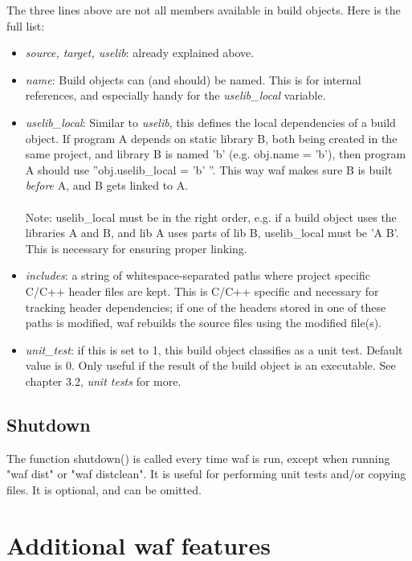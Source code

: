 \documentclass[a4paper,10pt]{article}
\begin{document}
\vspace{10mm}
The three lines above are not all members available in build objects. Here is the full list:
\begin{itemize}

\item \emph{source, target, uselib}: already explained above.

\item \emph{name}: Build objects can (and should) be named. This is for internal references, and especially handy for the \emph{uselib\_local} variable.

\item \emph{uselib\_local}: Similar to \emph{uselib}, this defines the local dependencies of a build object. If program A depends on static library B, both being created in the same project, and library B is named 'b' (e.g. obj.name = 'b'), then program A should use ''obj.uselib\_local = 'b' ''. This way waf makes sure B is built \emph{before} A, and B gets linked to A.\\
\\
Note: uselib\_local must be in the right order, e.g. if a build object uses the libraries A and B, and lib A uses parts of lib B, uselib\_local must be 'A B'. This is necessary for ensuring proper linking.

\item \emph{includes}: a string of whitespace-separated paths where project specific C/C++ header files are kept. This is C/C++ specific and necessary for tracking header dependencies; if one of the headers stored in one of these paths is modified, waf rebuilds the source files using the modified file(s).

\item \emph{unit\_test}: if this is set to 1, this build object classifies as a unit test. Default value is 0. Only useful if the result of the build object is an executable. See chapter 3.2, \emph{unit tests} for more.

\end{itemize}

\subsection{Shutdown}
The function shutdown() is called every time waf is run, except when running "waf dist" or "waf distclean". It is useful for performing unit tests and/or copying files. It is optional, and can be omitted.


\section{Additional waf features}
\end{document}
